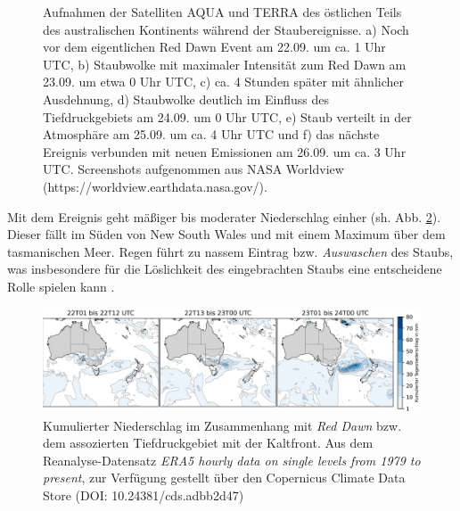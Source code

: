 \documentclass[12pt,a4paper,onecolumn]{scrartcl}
\begin{document}
\begin{figure}[ht]
\begin{minipage}[c]{0.32\textwidth}
	\end{minipage}\hfill
\caption{Aufnahmen der Satelliten AQUA und TERRA des östlichen Teils des australischen Kontinents während der Staubereignisse. a) Noch vor dem eigentlichen Red Dawn Event am 22.09. um ca. 1 Uhr UTC, b) Staubwolke mit maximaler Intensität zum Red Dawn am 23.09. um etwa 0 Uhr UTC, c) ca. 4 Stunden später mit ähnlicher Ausdehnung, d) Staubwolke deutlich im Einfluss des Tiefdruckgebiets am 24.09. um 0 Uhr UTC, e) Staub verteilt in der Atmosphäre am 25.09. um ca. 4 Uhr UTC und f) das nächste Ereignis verbunden mit neuen Emissionen am 26.09. um ca. 3 Uhr UTC.  Screenshots aufgenommen aus NASA Worldview (https://worldview.earthdata.nasa.gov/).} \label{fig:satellite}
\end{figure}

Mit dem Ereignis geht mäßiger bis moderater Niederschlag einher (sh. Abb.  \ref{fig:rain}). Dieser fällt im Süden von New South Wales und mit einem Maximum über dem tasmanischen Meer. Regen führt zu nassem Eintrag bzw. \textit{Auswaschen} des Staubs, was insbesondere für die Löslichkeit des eingebrachten Staubs eine entscheidene Rolle spielen kann \citep{Gabric.2016}. 

\begin{figure}[ht]
\includegraphics[width=\textwidth]{bilder/reddawn/rain.png}
\caption{Kumulierter Niederschlag im Zusammenhang mit \textit{Red Dawn} bzw. dem assozierten Tiefdruckgebiet mit der Kaltfront. Aus dem Reanalyse-Datensatz \textit{ERA5 hourly data on single levels from 1979 to present}, zur Verfügung gestellt über den Copernicus Climate Data Store (DOI: 10.24381/cds.adbb2d47) } \label{fig:rain}
\end{figure}
\end{document}
